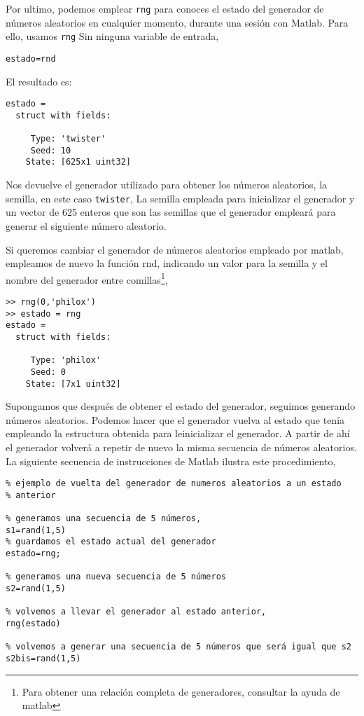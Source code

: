 Por ultimo, podemos emplear \texttt{rng} para conoces el estado del generador de números aleatorios en cualquier momento, durante una sesión con Matlab. Para ello, usamos \texttt{rng} Sin ninguna variable de entrada,
\begin{verbatim}
estado=rnd
\end{verbatim}
El resultado es:
\begin{verbatim}
estado = 
  struct with fields:

     Type: 'twister'
     Seed: 10
    State: [625x1 uint32]
\end{verbatim}
Nos devuelve el generador utilizado para obtener los números aleatorios, la semilla, en este caso \texttt{twister}, La semilla empleada para inicializar el generador y un vector de 625 enteros que son las semillas que el generador empleará para generar el siguiente número aleatorio.

Si queremos cambiar el generador de números aleatorios empleado por matlab, empleamos de nuevo la función rnd, indicando un valor para la semilla y el nombre del generador entre comillas\footnote{Para obtener una relación completa de generadores, consultar la ayuda de matlab},
\begin{verbatim}
>> rng(0,'philox')
>> estado = rng
estado = 
  struct with fields:

     Type: 'philox'
     Seed: 0
    State: [7x1 uint32]
\end{verbatim}

Supongamos que después de obtener el estado del generador, seguimos generando números aleatorios. Podemos hacer que el generador vuelva al estado que tenía empleando la estructura obtenida para leinicializar el generador. A partir de ahí el generador volverá a repetir de nuevo la misma secuencia de números aleatorios. La siguiente secuencia de instrucciones de Matlab ilustra este procedimiento,
\begin{lstlisting}
% ejemplo de vuelta del generador de numeros aleatorios a un estado
% anterior

% generamos una secuencia de 5 números,
s1=rand(1,5)
% guardamos el estado actual del generador
estado=rng;

% generamos una nueva secuencia de 5 números
s2=rand(1,5)

% volvemos a llevar el generador al estado anterior,
rng(estado)

% volvemos a generar una secuencia de 5 números que será igual que s2
s2bis=rand(1,5)
\end{lstlisting}

